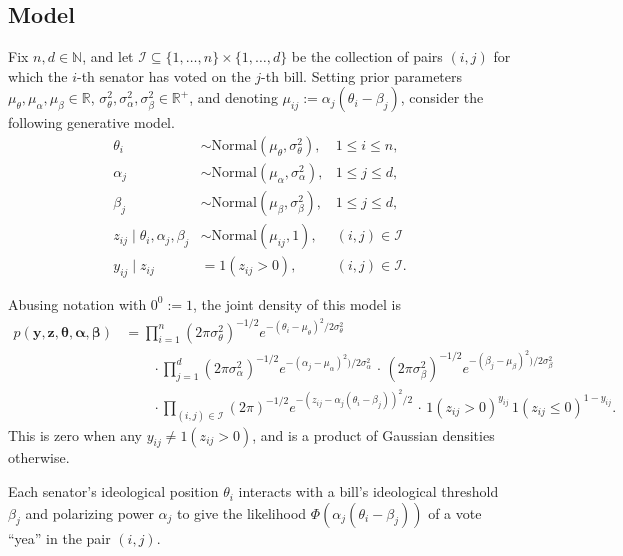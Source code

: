 \documentclass[12pt]{article}
\newcommand{\N}{\mathbb{N}}
\newcommand{\R}{\mathbb{R}}
\begin{document}
\subsection*{Model}

Fix $n, d \in \N$, and let $\mathscr{I} \subseteq \{1, \dots, n\} \times \{1,
\dots, d\}$ be the collection of pairs $(i, j)$ for which the $i$-th senator
has voted on the $j$-th bill.
Setting prior parameters $\mu_\theta, \mu_\alpha, \mu_\beta \in \R$,
$\sigma_\theta^2, \sigma_\alpha^2, \sigma_\beta^2 \in \R^+$, and denoting
$\mu_{ij} := \alpha_j (\theta_i - \beta_j)$, consider the following generative
model.
\begin{align*}
    \theta_i &\sim \text{Normal}(\mu_\theta, \sigma_\theta^2), &1 \leq i \leq n, \\
    \alpha_j &\sim \text{Normal}(\mu_\alpha, \sigma_\alpha^2), &1 \leq j \leq d, \\
    \beta_j  &\sim \text{Normal}(\mu_\beta,  \sigma_\beta^2),  &1 \leq j \leq d, \\
    z_{ij} \mid \theta_i, \alpha_j, \beta_j &\sim \text{Normal}(\mu_{ij}, 1), &(i, j) \in \mathscr{I} \\
    y_{ij} \mid z_{ij} &= 1(z_{ij} > 0), &(i, j) \in \mathscr{I}.
\end{align*}

Abusing notation with $0^0 := 1$, the joint density of this model is
\begin{align*}
    p(\bm{y}, \bm{z}, \bm{\theta}, \bm{\alpha}, \bm{\beta})
        &= \prod_{i = 1}^n (2\pi\sigma_\theta^2)^{-1 /2} e^{-(\theta_i - \mu_\theta)^2 /2\sigma_\theta^2} \\
            &\qquad\cdot\prod_{j = 1}^d (2\pi\sigma_\alpha^2)^{-1 /2} e^{-(\alpha_j - \mu_\alpha)^2) /2\sigma_\alpha^2}\,\cdot\,
                (2\pi\sigma_\beta^2)^{-1 /2} e^{-(\beta_j - \mu_\beta)^2) /2\sigma_\beta^2} \\
            &\qquad\cdot\prod_{(i, j) \in \mathscr{I}} (2\pi)^{-1 /2}e^{-(z_{ij} - \alpha_j(\theta_i - \beta_j))^2 / 2} \,\cdot\,
                1(z_{ij} > 0)^{y_{ij}}\,1(z_{ij}\leq 0)^{1 - y_{ij}}.
\end{align*}
This is zero when any $y_{ij} \neq 1(z_{ij} > 0)$, and is a product of
Gaussian densities otherwise.

Each senator's ideological position $\theta_i$ interacts with a bill's
ideological threshold $\beta_j$ and polarizing power $\alpha_j$ to give the
likelihood $\Phi(\alpha_j(\theta_i - \beta_j))$ of a vote ``yea'' in the pair
$(i, j)$.
\end{document}
